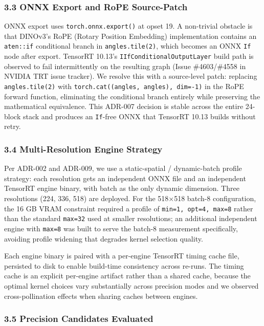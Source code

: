 \documentclass[
]{article}
\begin{document}
\subsubsection{3.3 ONNX Export and RoPE
Source-Patch}\label{onnx-export-and-rope-source-patch}

ONNX export uses \texttt{torch.onnx.export()} at opset 19. A non-trivial
obstacle is that DINOv3's RoPE (Rotary Position Embedding)
implementation contains an \texttt{aten::if} conditional branch in
\texttt{angles.tile(2)}, which becomes an ONNX \texttt{If} node after
export. TensorRT 10.13's \texttt{IIfConditionalOutputLayer} build path
is observed to fail intermittently on the resulting graph (Issue
\#4603/\#4558 in NVIDIA TRT issue tracker). We resolve this with a
source-level patch: replacing \texttt{angles.tile(2)} with
\texttt{torch.cat((angles,\ angles),\ dim=-1)} in the RoPE forward
function, eliminating the conditional branch entirely while preserving
the mathematical equivalence. This ADR-007 decision is stable across the
entire 24-block stack and produces an \texttt{If}-free ONNX that
TensorRT 10.13 builds without retry.

\subsubsection{3.4 Multi-Resolution Engine
Strategy}\label{multi-resolution-engine-strategy}

Per ADR-002 and ADR-009, we use a static-spatial / dynamic-batch profile
strategy: each resolution gets an independent ONNX file and an
independent TensorRT engine binary, with batch as the only dynamic
dimension. Three resolutions (224, 336, 518) are deployed. For the
518×518 batch-8 configuration, the 16 GB VRAM constraint required a
profile of \texttt{min=1,\ opt=4,\ max=8} rather than the standard
\texttt{max=32} used at smaller resolutions; an additional independent
engine with \texttt{max=8} was built to serve the batch-8 measurement
specifically, avoiding profile widening that degrades kernel selection
quality.

Each engine binary is paired with a per-engine TensorRT timing cache
file, persisted to disk to enable build-time consistency across re-runs.
The timing cache is an explicit per-engine artifact rather than a shared
cache, because the optimal kernel choices vary substantially across
precision modes and we observed cross-pollination effects when sharing
caches between engines.

\subsubsection{3.5 Precision Candidates
Evaluated}\label{precision-candidates-evaluated}
\end{document}
